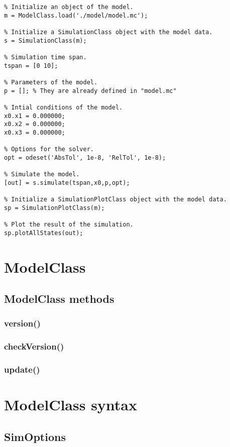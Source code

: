\documentclass[11pt]{article}
\begin{document}
\begin{lstlisting}
% Initialize an object of the model.
m = ModelClass.load('./model/model.mc');

% Initialize a SimulationClass object with the model data.
s = SimulationClass(m);

% Simulation time span.
tspan = [0 10];

% Parameters of the model.
p = []; % They are already defined in "model.mc"

% Intial conditions of the model.
x0.x1 = 0.000000;
x0.x2 = 0.000000;
x0.x3 = 0.000000;

% Options for the solver.
opt = odeset('AbsTol', 1e-8, 'RelTol', 1e-8);

% Simulate the model.
[out] = s.simulate(tspan,x0,p,opt);

% Initialize a SimulationPlotClass object with the model data.
sp = SimulationPlotClass(m);

% Plot the result of the simulation.
sp.plotAllStates(out);
\end{lstlisting}

\section{ModelClass}

\subsection{ModelClass methods}

\subsubsection{version()}

\subsubsection{checkVersion()}

\subsubsection{update()}

\section{ModelClass syntax}

\subsection{SimOptions}
\end{document}
